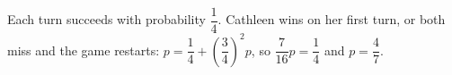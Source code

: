 Each turn succeeds with probability $\dfrac14$. Cathleen wins on her first turn, or both miss and the game restarts: $p=\dfrac14+\left(\dfrac34\right)^2p$, so $\dfrac7{16}p=\dfrac14$ and $p=\boxed{\dfrac47}$.
